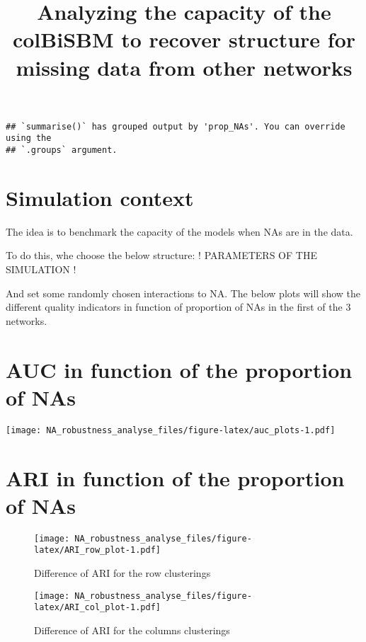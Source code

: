 \documentclass[
]{article}
\title{Analyzing the capacity of the colBiSBM to recover structure for
missing data from other networks}
\author{}
\date{\vspace{-2.5em}}
\begin{document}
\maketitle

\begin{verbatim}
## `summarise()` has grouped output by 'prop_NAs'. You can override using the
## `.groups` argument.
\end{verbatim}

\hypertarget{simulation-context}{%
\section{Simulation context}\label{simulation-context}}

The idea is to benchmark the capacity of the models when NAs are in the
data.

To do this, whe choose the below structure: ! PARAMETERS OF THE
SIMULATION !

And set some randomly chosen interactions to NA. The below plots will
show the different quality indicators in function of proportion of NAs
in the first of the 3 networks.

\hypertarget{auc-in-function-of-the-proportion-of-nas}{%
\section{AUC in function of the proportion of
NAs}\label{auc-in-function-of-the-proportion-of-nas}}

\texttt{[image: NA\_robustness\_analyse\_files/figure-latex/auc\_plots-1.pdf]}

\hypertarget{ari-in-function-of-the-proportion-of-nas}{%
\section{ARI in function of the proportion of
NAs}\label{ari-in-function-of-the-proportion-of-nas}}

\begin{figure}
\centering
\texttt{[image: NA\_robustness\_analyse\_files/figure-latex/ARI\_row\_plot-1.pdf]}
\caption{Difference of ARI for the row clusterings}
\end{figure}

\begin{figure}
\centering
\texttt{[image: NA\_robustness\_analyse\_files/figure-latex/ARI\_col\_plot-1.pdf]}
\caption{Difference of ARI for the columns clusterings}
\end{figure}
\end{document}

